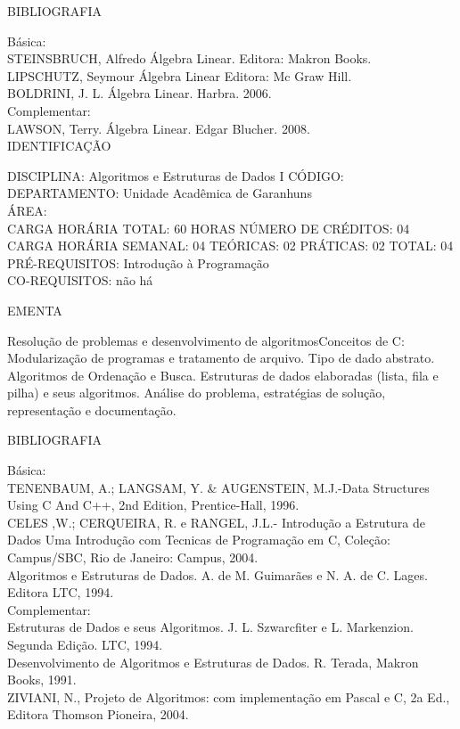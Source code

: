 \documentclass[
	12pt,				%
	openright,			%
  oneside,     %
	a4paper,			%
	chapter=TITLE,		%
	english,			%
	french,				%
	spanish,			%
	brazil				%
	]{abntex2}
\begin{document}
\begin{apendicesenv}
BIBLIOGRAFIA 

Básica:\\
STEINSBRUCH, Alfredo  Álgebra Linear. Editora: Makron Books.\\
LIPSCHUTZ, Seymour  Álgebra Linear  Editora: Mc Graw Hill.\\
BOLDRINI, J. L. Álgebra Linear. Harbra. 2006.\\
Complementar:\\
LAWSON, Terry. Álgebra Linear. Edgar Blucher. 2008.\\


\newpage IDENTIFICAÇÃO

DISCIPLINA: Algoritmos e Estruturas de Dados I CÓDIGO:\\ 
DEPARTAMENTO: Unidade Acadêmica de Garanhuns\\
ÁREA: \\
CARGA HORÁRIA TOTAL: 60 HORAS NÚMERO DE CRÉDITOS: 04\\
CARGA HORÁRIA SEMANAL: 04 TEÓRICAS: 02 PRÁTICAS: 02 TOTAL: 04\\
PRÉ-REQUISITOS: Introdução à Programação\\
CO-REQUISITOS: não há

EMENTA 

Resolução de problemas e desenvolvimento de algoritmosConceitos de C:
Modularização de programas e tratamento de arquivo. Tipo de dado
abstrato. Algoritmos de Ordenação e Busca. Estruturas de dados
elaboradas (lista, fila e pilha) e seus algoritmos. Análise do
problema, estratégias de solução, representação e documentação.

BIBLIOGRAFIA 

Básica:\\
TENENBAUM, A.; LANGSAM, Y. \& AUGENSTEIN, M.J.-Data Structures Using C
And C++, 2nd Edition, Prentice-Hall, 1996.\\
CELES ,W.; CERQUEIRA, R. e RANGEL, J.L.- Introdução a Estrutura de Dados
Uma Introdução com Tecnicas de Programação em C, Coleção: Campus/SBC,
Rio de Janeiro: Campus, 2004.\\
Algoritmos e Estruturas de Dados. A. de M. Guimarães e N. A. de C.
Lages. Editora LTC, 1994.\\
Complementar:\\
Estruturas de Dados e seus Algoritmos. J. L. Szwarcfiter e L.
Markenzion. Segunda Edição. LTC, 1994.\\
Desenvolvimento de Algoritmos e Estruturas de Dados. R. Terada, Makron
Books, 1991.\\
ZIVIANI, N., Projeto de Algoritmos: com implementação em Pascal e C, 2a
Ed., Editora Thomson Pioneira, 2004.\\



\end{apendicesenv}
\end{document}
